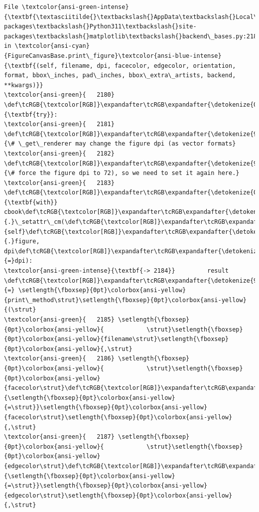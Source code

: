 \documentclass[11pt]{article}
\begin{document}
\begin{Verbatim}[commandchars=\\\{\}, frame=single, framerule=2mm, rulecolor=\color{outerrorbackground}]
File \textcolor{ansi-green-intense}{\textbf{\textasciitilde{}\textbackslash{}AppData\textbackslash{}Local\textbackslash{}Packages\textbackslash{}PythonSoftwareFoundation.Python.3.11\_qbz5n2kfra8p0\textbackslash{}LocalCache\textbackslash{}local-packages\textbackslash{}Python311\textbackslash{}site-packages\textbackslash{}matplotlib\textbackslash{}backend\_bases.py:2184}}, in \textcolor{ansi-cyan}{FigureCanvasBase.print\_figure}\textcolor{ansi-blue-intense}{\textbf{(self, filename, dpi, facecolor, edgecolor, orientation, format, bbox\_inches, pad\_inches, bbox\_extra\_artists, backend, **kwargs)}}
\textcolor{ansi-green}{   2180} \def\tcRGB{\textcolor[RGB]}\expandafter\tcRGB\expandafter{\detokenize{0,135,0}}{\textbf{try}}:
\textcolor{ansi-green}{   2181}     \def\tcRGB{\textcolor[RGB]}\expandafter\tcRGB\expandafter{\detokenize{95,135,135}}{\# \_get\_renderer may change the figure dpi (as vector formats}
\textcolor{ansi-green}{   2182}     \def\tcRGB{\textcolor[RGB]}\expandafter\tcRGB\expandafter{\detokenize{95,135,135}}{\# force the figure dpi to 72), so we need to set it again here.}
\textcolor{ansi-green}{   2183}     \def\tcRGB{\textcolor[RGB]}\expandafter\tcRGB\expandafter{\detokenize{0,135,0}}{\textbf{with}} cbook\def\tcRGB{\textcolor[RGB]}\expandafter\tcRGB\expandafter{\detokenize{98,98,98}}{.}\_setattr\_cm(\def\tcRGB{\textcolor[RGB]}\expandafter\tcRGB\expandafter{\detokenize{0,135,0}}{self}\def\tcRGB{\textcolor[RGB]}\expandafter\tcRGB\expandafter{\detokenize{98,98,98}}{.}figure, dpi\def\tcRGB{\textcolor[RGB]}\expandafter\tcRGB\expandafter{\detokenize{98,98,98}}{=}dpi):
\textcolor{ansi-green-intense}{\textbf{-> 2184}}         result \def\tcRGB{\textcolor[RGB]}\expandafter\tcRGB\expandafter{\detokenize{98,98,98}}{=} \setlength{\fboxsep}{0pt}\colorbox{ansi-yellow}{print\_method\strut}\setlength{\fboxsep}{0pt}\colorbox{ansi-yellow}{(\strut}
\textcolor{ansi-green}{   2185} \setlength{\fboxsep}{0pt}\colorbox{ansi-yellow}{            \strut}\setlength{\fboxsep}{0pt}\colorbox{ansi-yellow}{filename\strut}\setlength{\fboxsep}{0pt}\colorbox{ansi-yellow}{,\strut}
\textcolor{ansi-green}{   2186} \setlength{\fboxsep}{0pt}\colorbox{ansi-yellow}{            \strut}\setlength{\fboxsep}{0pt}\colorbox{ansi-yellow}{facecolor\strut}\def\tcRGB{\textcolor[RGB]}\expandafter\tcRGB\expandafter{\detokenize{98,98,98}}{\setlength{\fboxsep}{0pt}\colorbox{ansi-yellow}{=\strut}}\setlength{\fboxsep}{0pt}\colorbox{ansi-yellow}{facecolor\strut}\setlength{\fboxsep}{0pt}\colorbox{ansi-yellow}{,\strut}
\textcolor{ansi-green}{   2187} \setlength{\fboxsep}{0pt}\colorbox{ansi-yellow}{            \strut}\setlength{\fboxsep}{0pt}\colorbox{ansi-yellow}{edgecolor\strut}\def\tcRGB{\textcolor[RGB]}\expandafter\tcRGB\expandafter{\detokenize{98,98,98}}{\setlength{\fboxsep}{0pt}\colorbox{ansi-yellow}{=\strut}}\setlength{\fboxsep}{0pt}\colorbox{ansi-yellow}{edgecolor\strut}\setlength{\fboxsep}{0pt}\colorbox{ansi-yellow}{,\strut}

\end{Verbatim}
\end{document}

